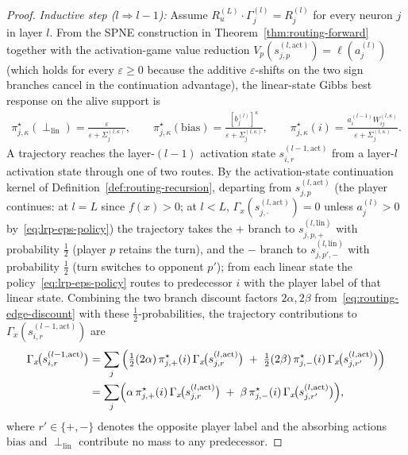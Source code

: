 \documentclass[twoside]{article}
\newcommand{\1}{\mathbf{1}}
\begin{document}
\begin{proof}
\emph{Inductive step ($l \Rightarrow l-1$):} Assume $R_u^{(L)} \cdot \Gamma^{(l)}_j = R^{(l)}_j$
for every neuron $j$ in layer $l$. From the SPNE construction in Theorem~\ref{thm:routing-forward}
together with the activation-game value reduction $V_p(s_{j,p}^{(l,\mathrm{act})}) =
    \ell(a_j^{(l)})$ (which holds for every $\varepsilon \ge 0$ because the additive
$\varepsilon$-shifts on the two sign branches cancel in the continuation advantage), the
linear-state Gibbs best response on the alive support is
\begin{align}\label{eq:lrp-eps-policy}
    \pi_{j,\kappa}^\star(\perp_{\mathrm{lin}}) = \frac{\varepsilon}{\varepsilon +
    \Sigma_j^{(l,\kappa)}},
    \qquad
    \pi_{j,\kappa}^\star(\mathrm{bias}) = \frac{[b_j^{(l)}]^\kappa}{\varepsilon +
    \Sigma_j^{(l,\kappa)}},
    \qquad
    \pi_{j,\kappa}^\star(i) = \frac{a_i^{(l-1)} W_{ij}^{(l,\kappa)}}{\varepsilon +
    \Sigma_j^{(l,\kappa)}}.
\end{align}
A trajectory reaches the layer-$(l-1)$ activation state $s_{i,r}^{(l-1, \mathrm{act})}$ from a
layer-$l$ activation state through one of two routes. By the activation-state continuation kernel
of Definition~\ref{def:routing-recursion}, departing from $s_{j,p}^{(l, \mathrm{act})}$ (the player
continues: at $l=L$ since $f(x)>0$; at $l<L$, $\Gamma_x(s_{j,\cdot}^{(l,\mathrm{act})})=0$ unless
$a_j^{(l)}>0$ by~\eqref{eq:lrp-eps-policy}) the trajectory takes the $+$ branch to $s_{j,p,+}^{(l,
    \mathrm{lin})}$ with probability $\tfrac12$ (player $p$ retains the turn), and the $-$ branch to
$s_{j,p',-}^{(l, \mathrm{lin})}$ with probability $\tfrac12$ (turn switches to opponent $p'$); from
each linear state the policy~\eqref{eq:lrp-eps-policy} routes to predecessor $i$ with the player
label of that linear state. Combining the two branch discount factors $2\alpha, 2\beta$
from~\eqref{eq:routing-edge-discount} with these $\tfrac12$-probabilities, the trajectory
contributions to $\Gamma_x(s_{i,r}^{(l-1,\mathrm{act})})$ are
\begin{align}
    \Gamma_x\!\bigl(s_{i,r}^{(l-1, \mathrm{act})}\bigr)
    &=
    \sum_j \left(
    \tfrac12 (2\alpha)\, \pi_{j,+}^\star(i)\, \Gamma_x\!\bigl(s_{j,r}^{(l, \mathrm{act})}\bigr)
    \;+\;
    \tfrac12 (2\beta)\, \pi_{j,-}^\star(i)\, \Gamma_x\!\bigl(s_{j,r'}^{(l, \mathrm{act})}\bigr)
    \right) \nonumber \\
    &=
    \sum_j \Bigl(
    \alpha\, \pi_{j,+}^\star(i)\, \Gamma_x\!\bigl(s_{j,r}^{(l, \mathrm{act})}\bigr)
    \;+\;
    \beta\, \pi_{j,-}^\star(i)\, \Gamma_x\!\bigl(s_{j,r'}^{(l, \mathrm{act})}\bigr)
    \Bigr), \label{eq:routing-per-state-recursion}
\end{align}
where $r' \in \{+,-\}$ denotes the opposite player label and the absorbing actions $\mathrm{bias}$
and $\perp_{\mathrm{lin}}$ contribute no mass to any predecessor.


\end{proof}
\end{document}
